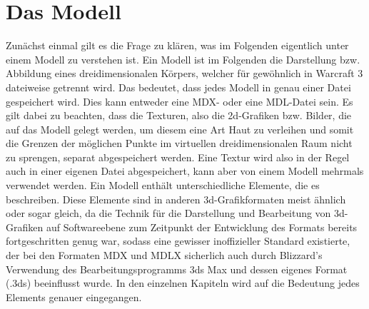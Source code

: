 \section{Das Modell}
Zunächst einmal gilt es die Frage zu klären, was im Folgenden eigentlich unter einem Modell zu verstehen ist. Ein Modell ist im Folgenden die Darstellung  bzw. Abbildung eines dreidimensionalen Körpers, welcher für gewöhnlich in Warcraft 3 dateiweise getrennt wird. Das bedeutet, dass jedes Modell in genau einer Datei gespeichert wird. Dies kann entweder eine MDX- oder eine MDL-Datei sein.
Es gilt dabei zu beachten, dass die Texturen, also die 2d-Grafiken bzw. Bilder, die auf das Modell gelegt werden,
um diesem eine Art Haut zu verleihen und somit die Grenzen der möglichen Punkte im virtuellen dreidimensionalen Raum nicht zu sprengen, separat abgespeichert werden.
Eine Textur wird also in der Regel auch in einer eigenen Datei abgespeichert, kann aber von einem
Modell mehrmals verwendet werden.
Ein Modell enthält unterschiedliche Elemente, die es beschreiben. Diese Elemente sind in anderen 3d-Grafikformaten meist ähnlich oder sogar gleich,
da die Technik für die Darstellung und Bearbeitung von 3d-Grafiken auf Softwareebene zum Zeitpunkt der Entwicklung des Formats bereits fortgeschritten genug war, sodass eine gewisser inoffizieller Standard existierte,
der bei den Formaten MDX und MDLX sicherlich auch durch Blizzard's Verwendung des Bearbeitungsprogramms
3ds Max und dessen eigenes Format (.3ds) beeinflusst wurde.
In den einzelnen Kapiteln wird auf die Bedeutung jedes Elements genauer eingegangen.



